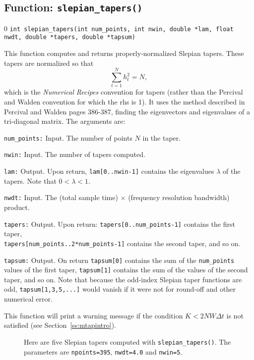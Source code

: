 \subsection{Function: {\tt slepian\_tapers()} }
\setcounter{equation}0
{\tt int slepian\_tapers(int num\_points, int nwin, double *lam, float nwdt, double *tapers, double *tapsum)}

This function computes and returns properly-normalized Slepian tapers. 
These tapers are normalized so that
\begin{equation}
\sum_{t=1}^N h_t^2 = N,
\end{equation}
which is the {\it Numerical Recipes} convention for tapers (rather than
the Percival and Walden convention for which the rhs is 1).
It uses the method described in Percival and Walden
\cite{percivalwalden} pages 386-387, finding the eigenvectors and
eigenvalues of a tri-diagonal matrix.  The arguments are:

\begin{description}
\item{\tt num\_points:} Input. The number of points $N$ in the taper.
\item{\tt nwin:} Input. The number of tapers computed.
\item{\tt lam:} Output.  Upon return, {\tt lam[0..nwin-1]} contains the eigenvalues $\lambda$ of the
    tapers.  Note that $0<\lambda < 1$.
\item{\tt nwdt:} Input.  The (total sample time) $\times$ (frequency resolution bandwidth) product.
\item{\tt tapers:} Output.  Upon return: {\tt tapers[0..num\_points-1]}
contains the first taper,\\{\tt tapers[num\_points..2*num\_points-1]}
contains the second taper, and so on.
\item{\tt tapsum:} Output.  On return {\tt tapsum[0]} contains the sum of the {\tt num\_points} values
of the first taper, {\tt tapsum[1]} contains the sum of the values of the second taper, and so on.  Note
that because the odd-index Slepian taper functions are odd, {\tt tapsum[1,3,5,...]} would vanish
if it were not for round-off and other numerical error.
\end{description}

This function will print a warning message if the condition $K< 2NW \Delta t$ is not satisfied
(see Section~\ref{ss:mtapintro}).
\vskip -0.3in
\begin{figure}[hb]
\begin{center}
\caption{ \label{f:slepians} Here are five Slepian tapers computed
with {\tt slepian\_tapers()}.  The parameters are {\tt npoints=395},
{\tt nwdt=4.0} and {\tt nwin=5}.}
\end{center}
\end{figure}


